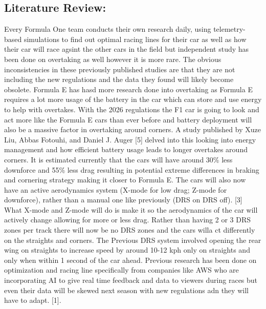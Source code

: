 \documentclass[11pt]{article} %
\begin{document}
\subsection {Literature Review:} Every Formula One team conducts their own research daily, using telemetry-based simulations to find out optimal racing lines for their car as well as how their car will race agsint the other cars in the field but independent study has been done on overtaking as well however it is more rare. The obvious inconsistencies in these previously published studies are that they are not including the new regulations and the data they found will likely become obsolete. Formula E has hasd more research done into overtaking as Formula E requires a lot more usage of the battery in the car which can store and use energy to help with overtakes. With the 2026 regulations the F1 car is going to look and act more like the Formula E cars than ever before and battery deployment will also be a massive factor in overtaking around corners. A study published by Xuze Liu, Abbas Fotouhi, and Daniel J. Auger [5] delved into this looking into energy management and how efficient battery usage leads to longer overtakes around corners. It is estimated currently that the cars will have around 30\% less downforce and 55\% less drag resulting in potential extreme differences in braking and cornering strategy making it closer to Formula E. The cars will also now have an active aerodynamics system (X-mode for low drag; Z-mode for downforce), rather than a manual one like previously (DRS on DRS off). [3] What X-mode and Z-mode will do is make it so the aerodynamics of the car will actively change allowing for more or less drag. Rather than having 2 or 3 DRS zones per track there will now be no DRS zones and the cars willa ct differently on the straights and corners. The Previous DRS system involved opening the rear wing on straights to increase speed by around 10-12 kph only on straights and only when within 1 second of the car ahead. Previous research has been done on optimization and racing line specifically from companies like AWS who are incorporating AI to give real time feedback and data to viewers during races but even their data will be skewed next season with new regulations adn they will have to adapt. [1]. 
\end{document}
